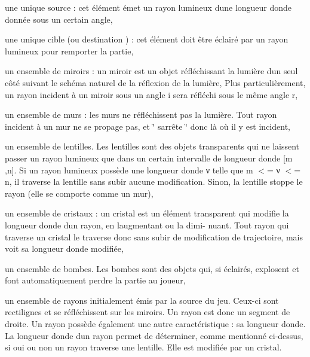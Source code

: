 \begin{DoxyItemize}
\item une unique source \+: cet élément émet un rayon lumineux d\textquotesingle{}une longueur d\textquotesingle{}onde donnée sous un certain angle,
\item une unique cible (ou destination ) \+: cet élément doit être éclairé par un rayon lumineux pour remporter la partie,
\item un ensemble de miroirs \+: un miroir est un objet réfléchissant la lumière d\textquotesingle{}un seul côté suivant le schéma naturel de la réflexion de la lumière, Plus particulièrement, un rayon incident à un miroir sous un angle  i sera réfléchi sous le même angle  r,
\item un ensemble de murs \+: les murs ne réfléchissent pas la lumière. Tout rayon incident à un mur ne se propage pas, et \char`\"{} s\textquotesingle{}arrête \char`\"{} donc là où il y est incident,
\item un ensemble de lentilles. Les lentilles sont des objets transparents qui ne laissent passer un rayon lumineux que dans un certain intervalle de longueur d\textquotesingle{}onde \mbox{[}m ,n\mbox{]}. Si un rayon lumineux possède une longueur d\textquotesingle{}onde ν telle que m $<$= ν $<$= n, il traverse la lentille sans subir aucune modification. Sinon, la lentille stoppe le rayon (elle se comporte comme un mur),
\item un ensemble de cristaux \+: un cristal est un élément transparent qui modifie la longueur d\textquotesingle{}onde d\textquotesingle{}un rayon, en l\textquotesingle{}augmentant ou la dimi-\/ nuant. Tout rayon qui traverse un cristal le traverse donc sans subir de modification de trajectoire, mais voit sa longueur d\textquotesingle{}onde modifiée,
\item un ensemble de bombes. Les bombes sont des objets qui, si éclairés, explosent et font automatiquement perdre la partie au joueur,
\item un ensemble de rayons initialement émis par la source du jeu. Ceux-\/ci sont rectilignes et se réfléchissent sur les miroirs. Un rayon est donc un segment de droite. Un rayon possède également une autre caractéristique \+: sa longueur d\textquotesingle{}onde. La longueur d\textquotesingle{}onde d\textquotesingle{}un rayon permet de déterminer, comme mentionné ci-\/dessus, si oui ou non un rayon traverse une lentille. Elle est modifiée par un cristal. 
\end{DoxyItemize}